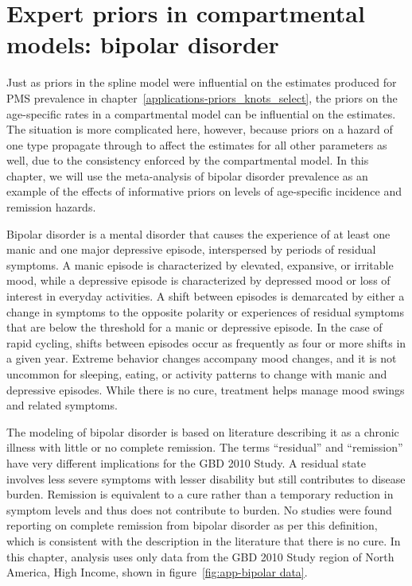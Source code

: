 \chapter{Expert priors in compartmental models: bipolar disorder}
\label{applications-prior_level_vals}

Just as priors in the spline model were influential on the estimates
produced for PMS prevalence in
chapter~\ref{applications-priors_knots_select}, the priors on the
age-specific rates in a compartmental model can be influential on the
estimates.  The situation is more complicated here, however, because
priors on a hazard of one type propagate through to affect the
estimates for all other parameters as well, due to the consistency
enforced by the compartmental model.  In this chapter, we will use the
meta-analysis of bipolar disorder prevalence as an example of the
effects of informative priors on levels of age-specific incidence and
remission hazards.

Bipolar disorder is a mental disorder that causes the experience
of at least one manic and one major depressive episode,
interspersed by periods of residual symptoms.  A manic episode is
characterized by elevated, expansive, or irritable mood, while a
depressive episode is characterized by depressed mood or loss of
interest in everyday activities.  A shift between episodes is
demarcated by either a change in symptoms to the opposite polarity
or experiences of residual symptoms that are below the threshold
for a manic or depressive episode.  In the case of rapid cycling,
shifts between episodes occur as frequently as four or more shifts
in a given year.  Extreme behavior
changes accompany mood changes, and it is not uncommon for sleeping,
eating, or activity patterns to change with manic and depressive
episodes.
While there
is no cure, treatment helps manage mood swings and related
symptoms. \cite{kloos_bipolar_2011, angst_historical_2000, TK_coauthor_ref}

The modeling of bipolar disorder is based on literature describing it
as a chronic illness with little or no complete remission.
The terms ``residual'' and ``remission'' have very different implications
for the GBD 2010 Study.  A residual state involves less severe
symptoms with lesser disability but still contributes to disease
burden.  Remission is equivalent to a cure rather than a temporary
reduction in symptom levels and thus does not contribute to burden.  No studies
were found reporting on complete remission from bipolar disorder as per this definition,
which is consistent with the description in the literature that there
is no cure. \cite{american_psychiatric_association_diagnostic_2000}
In this chapter, analysis
uses only data from the GBD 2010 Study region of North America, High Income,
shown in figure~\ref{fig:app-bipolar data}.

